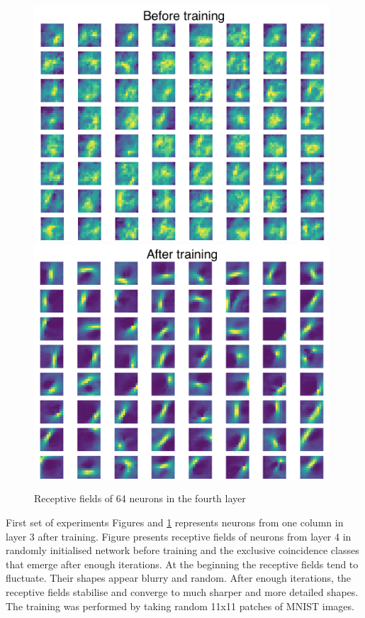 \documentclass[12pt]{article}
\begin{document}
\begin{figure}[!htbp]
	\centering
	\includegraphics[width=11cm]{predictive_coding_stacked2_experiment4 before}
	\includegraphics[width=11cm]{predictive_coding_stacked2_experiment4 after}
	\caption{Receptive fields of 64 neurons in the fourth layer}
	\label{fig:experiment4}
\end{figure} 

First set of experiments Figures and \ref{fig:experiment4} represents neurons from one column in layer 3 after training.
Figure presents receptive fields of neurons from layer 4 in randomly initialised network before training and the exclusive coincidence classes that emerge after enough iterations.
At the beginning the receptive fields tend to fluctuate. Their shapes appear blurry and random. After enough iterations, the receptive fields stabilise and converge to much sharper and more detailed shapes. The training was performed by taking random 11x11 patches of MNIST images.
\end{document}
